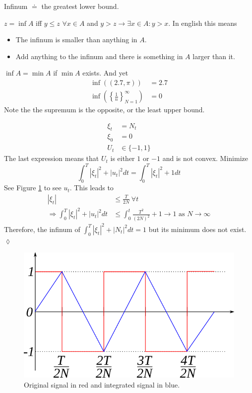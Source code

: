 \begin{definition}
Infinum $\doteq$ the greatest lower bound.
\end{definition}

$z = \inf A$ iff $y\leq z$ $\forall x\in A$ and $y>z\to\exists x\in A: y>x$. In english this means
\begin{itemize}
\item The infinum is smaller than anything in $A$.
\item Add anything to the infinum and there is something in $A$ larger than it.
\end{itemize}
$\inf A = \min A$ if $\min A$ exists. And yet
\begin{align*}
\inf((2.7,\pi)) &= 2.7 \\
\inf\left(\left\lbrace\frac{1}{n}\right\rbrace_{N=1}^\infty\right) &= 0
\end{align*}
Note the the supremum is the opposite, or the least upper bound.

\begin{example}
\begin{align*}
\xi_t &= N_t \\
\xi_0 &= 0 \\
U_t&\in\{-1,1\}
\end{align*}
The last expression means that $U_t$ is either $1$ or $-1$ and is not convex. Minimize
$$\int_0^T|\xi_t|^2 + |u_t|^2dt = \int_0^T|\xi_t|^2 + 1dt$$
See Figure \ref{fig:04signal} to see $u_t$. This leads to
\begin{align*}
|\xi_t| &\leq \frac{T}{2N} ~\forall t \\
\Rightarrow \int_0^T|\xi_t|^2+|u_t|^2dt &\leq \int_0^t\frac{T^2}{(2N)^2} + 1 \to 1 \text{ as } N\to\infty
\end{align*}
Therefore, the infinum of $\int_0^T|\xi_t|^2+|N_t|^2dt = 1$ but its minimum does not exist.
$\lozenge$
\end{example}

\begin{figure}[ht!]
	\centering
	\includegraphics[width=.4\textwidth]{images/04signal}
	\caption{Original signal in red and integrated signal in blue.}
	\label{fig:04signal}
\end{figure}

